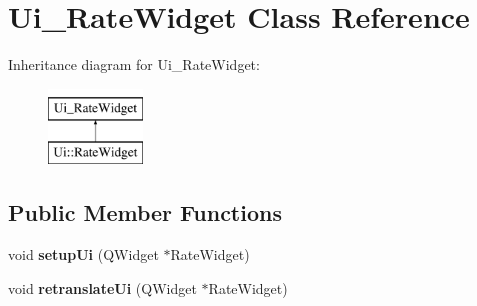 \hypertarget{classUi__RateWidget}{\section{Ui\-\_\-\-Rate\-Widget Class Reference}
\label{classUi__RateWidget}
}
Inheritance diagram for Ui\-\_\-\-Rate\-Widget\-:\begin{figure}[H]
\begin{center}
\leavevmode
\includegraphics[height=2.000000cm]{d9/de8/classUi__RateWidget}
\end{center}
\end{figure}
\subsection*{Public Member Functions}
\begin{DoxyCompactItemize}
\item 
\hypertarget{classUi__RateWidget_ac76a574972d8fb2689e34628ef3a656c}{void {\bfseries setup\-Ui} (Q\-Widget $\ast$Rate\-Widget)}\label{classUi__RateWidget_ac76a574972d8fb2689e34628ef3a656c}

\item 
\hypertarget{classUi__RateWidget_a0ce1bb96785f84bc0bedf499eb3c7fef}{void {\bfseries retranslate\-Ui} (Q\-Widget $\ast$Rate\-Widget)}\label{classUi__RateWidget_a0ce1bb96785f84bc0bedf499eb3c7fef}

\end{DoxyCompactItemize}

